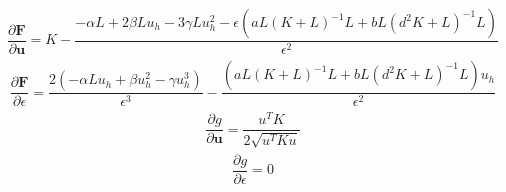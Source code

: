 \documentclass[a4paper, 11pt]{ltjsreport}
\theoremstyle{plain}
\theoremstyle{definition}
\begin{document}
\begin{align}
    \dfrac{\partial \bm{F}}{\partial \bm{u}} 
    = 
    K- \dfrac{-\alpha L + 2\beta  L u_h -3\gamma L u_h^2-\epsilon(aL(K+L)^{-1}L+bL(d^2K+L)^{-1}L) }{\epsilon^2}
\end{align}
\begin{align}
  \dfrac{\partial \bm{F}}{\partial \epsilon}
  =
  \dfrac{2(-\alpha L u_h + \beta  u_h^2 -\gamma  u_h^3)}{\epsilon^3}
  -\dfrac{(aL(K+L)^{-1}L+bL(d^2K+L)^{-1}L)u_h}{\epsilon^2}
\end{align}
\begin{align}
  \dfrac{\partial g}{\partial \bm{u}}= \dfrac{u^T K}{2\sqrt{u^T K u}}
\end{align}
\begin{align}
  \dfrac{\partial g}{\partial \epsilon}=0
\end{align}
\end{document}
